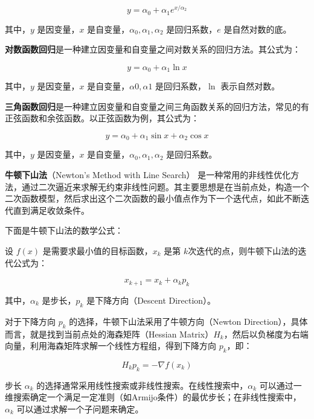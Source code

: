 \documentclass[bwprint]{gmcmthesis}
\begin{document}
\begin{equation}y=\alpha_0+\alpha_1e^{x/\alpha_2}\end{equation}

\noindent 其中，$y$ 是因变量，$x$ 是自变量，$\alpha_0, \alpha_1,\alpha_2$ 是回归系数，$e$ 是自然对数的底。

\textbf{对数函数回归}是一种建立因变量和自变量之间对数关系的回归方法。其公式为：

\begin{equation}y=\alpha_0+\alpha_1\ln{x}\end{equation}

\noindent 其中，$y$ 是因变量，$x$ 是自变量，$\alpha0, \alpha1$ 是回归系数，$\ln$ 表示自然对数。

\textbf{三角函数回归}是一种建立因变量和自变量之间三角函数关系的回归方法，常见的有正弦函数和余弦函数。以正弦函数为例，其公式为：

\begin{equation}y=\alpha_0+\alpha_1\sin{x}+\alpha_2\cos{x}\end{equation}

\noindent 其中，$y$ 是因变量，$x$ 是自变量，$\alpha_0, \alpha_1,\alpha_2$ 是回归系数。

\textbf{牛顿下山法}（Newton's Method with Line Search）\cite{kov2018NumericalLA} 是一种常用的非线性优化方法，通过二次逼近来求解无约束非线性问题。其主要思想是在当前点处，构造一个二次函数模型，然后求出这个二次函数的最小值点作为下一个迭代点，如此不断迭代直到满足收敛条件。

下面是牛顿下山法的数学公式：

设 $f(x)$ 是需要求最小值的目标函数，$x_k$ 是第 $k$次迭代的点，则牛顿下山法的迭代公式为：

\begin{equation}
x_{k+1} = x_k + \alpha_k p_k
\end{equation}

\noindent 其中，$\alpha_k$ 是步长，$p_k$ 是下降方向（Descent Direction）。

对于下降方向 $p_k$ 的选择，牛顿下山法采用了牛顿方向（Newton Direction），具体而言，就是找到当前点处的海森矩阵（Hessian Matrix）$H_k$，然后以负梯度为右端向量，利用海森矩阵求解一个线性方程组，得到下降方向 $p_k$，即：

\begin{equation}
H_k p_k = -\nabla f(x_k)
\end{equation}

步长 $\alpha_k$ 的选择通常采用线性搜索或非线性搜索。在线性搜索中，$\alpha_k$ 可以通过一维搜索确定一个满足一定准则（如Armijo条件）的最优步长；在非线性搜索中，$\alpha_k$ 可以通过求解一个子问题来确定。
\end{document}
